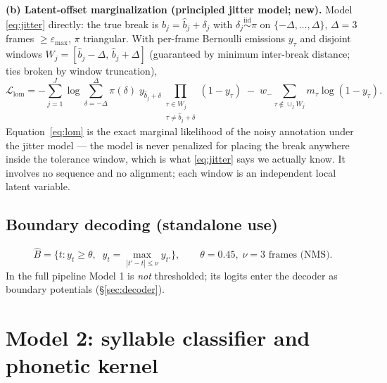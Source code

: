 \documentclass[10pt]{article}
\begin{document}
\textbf{(b) Latent-offset marginalization (principled jitter model; new).} Model \eqref{eq:jitter} directly: the true break is $b_j = \hat{b}_j + \delta_j$ with $\delta_j \overset{\text{iid}}{\sim} \pi$ on $\{-\Delta,\dots,\Delta\}$, $\Delta = 3$ frames $\ge \varepsilon_{\max}$, $\pi$ triangular. With per-frame Bernoulli emissions $y_\tau$ and disjoint windows $W_j = [\hat b_j - \Delta,\, \hat b_j + \Delta]$ (guaranteed by minimum inter-break distance; ties broken by window truncation),
\begin{equation}
\mathcal{L}_{\mathrm{lom}} = -\sum_{j=1}^{J} \log \sum_{\delta = -\Delta}^{\Delta} \pi(\delta)\; y_{\hat b_j + \delta} \!\!\prod_{\substack{\tau \in W_j \\ \tau \ne \hat b_j + \delta}}\!\! (1 - y_\tau)
\;-\; w_-\!\!\sum_{\tau \notin \cup_j W_j}\!\! m_\tau \log (1 - y_\tau).
\label{eq:lom}
\end{equation}
Equation~\eqref{eq:lom} is the exact marginal likelihood of the noisy annotation under the jitter model --- the model is never penalized for placing the break anywhere inside the tolerance window, which is what \eqref{eq:jitter} says we actually know. It involves no sequence and no alignment; each window is an independent local latent variable.

\subsection{Boundary decoding (standalone use)}
\begin{equation}
\hat{B} = \{ t : y_t \ge \theta,\;\; y_t = \max_{|t'-t| \le \nu} y_{t'} \}, \qquad \theta = 0.45,\; \nu = 3 \text{ frames (NMS)}.
\end{equation}
In the full pipeline Model 1 is \emph{not} thresholded; its logits enter the decoder as boundary potentials (\S\ref{sec:decoder}).

\section{Model 2: syllable classifier and phonetic kernel}\label{sec:model2}
\end{document}
